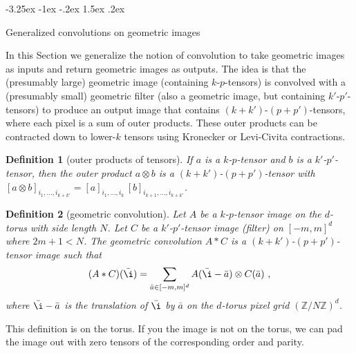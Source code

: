 \documentclass{article}
\makeatletter
\theoremstyle{plain}
\newtheorem{definition}{Definition}
\newcommand{\sectionname}{Section}
\renewcommand\section{\@startsection {section}{1}{\z@}%
  {-3.25ex \@plus -1ex \@minus -.2ex}%
  {1.5ex \@plus .2ex}%
  {\raggedright\normalfont\large\bfseries}}%
\makeatother
\begin{document}
\section{Generalized convolutions on geometric images}\label{sec:convolution}

In this \sectionname{} we generalize the notion of convolution to take geometric images as inputs and return geometric images as outputs.
The idea is that the (presumably large) geometric image (containing $k$-$p$-tensors) is convolved with a (presumably small) geometric filter (also a geometric image, but containing $k'$-$p'$-tensors) to produce an output image that contains $(k+k')$-$(p+p')$-tensors, where each pixel is a sum of outer products.
These outer products can be contracted down to lower-$k$ tensors using Kronecker or Levi-Civita contractions.

\begin{definition}[outer products of tensors]
If $a$ is a $k$-$p$-tensor and $b$ is a $k'$-$p'$-tensor, then the outer product $a\otimes b$ is a $(k+k')$-$(p+p')$-tensor with $[a\otimes b]_{i_1,\ldots,i_{k+k'}} = [a]_{i_1,\ldots,i_k}\,[b]_{i_{k+1},\ldots,i_{k+k'}}$.
\end{definition}


\begin{definition}[geometric convolution]
Let $A$ be a $k$-$p$-tensor image on the $d$-torus with side length $N$.
Let $C$ be a $k'$-$p'$-tensor image (filter) on $[-m, m]^d$ where $2m+1<N$.
The geometric convolution $A\ast C$ is a $(k+k')$-$(p+p')$-tensor image such that
\begin{equation}
    (A\ast C)(\bar\i) = \sum_{\bar a\in[-m, m]^d} A(\bar\i - \bar a)\otimes C(\bar a) ~,
\end{equation}
where $\bar\i - \bar a$ is the translation of $\bar\i$ by $\bar a$ on the $d$-torus pixel grid $(\mathbb Z / N\mathbb Z)^d$.
\end{definition}
This definition is on the torus. If you the image is not on the torus, we can pad the image out with zero tensors of the corresponding order and parity. 
\end{document}
